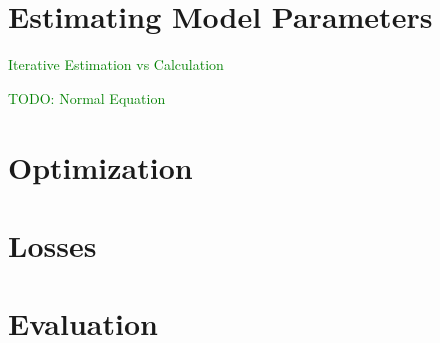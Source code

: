\chapter{Estimating Model Parameters}

\textcolor{green}{Iterative Estimation vs Calculation}

\textcolor{green}{TODO: Normal Equation}





\chapter{Optimization}



\chapter{Losses}






\chapter{Evaluation}










